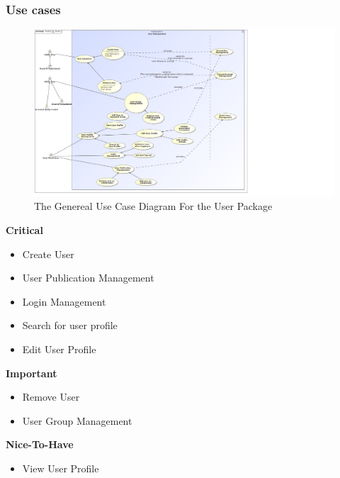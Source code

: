 \documentclass{article}
\begin{document}
	\subsubsection{Use cases}
		\begin{figure}[H]
				\includegraphics[width=1.5\linewidth]{ReinhardtImages/UserManagement.jpg}
				\caption{The Genereal Use Case Diagram For the User Package}
		  		\label{UseCaseDiagram_UserManagement}
			\end{figure}
			\begin{flushleft}
				\textbf{Critical}
					\begin{itemize}
		  				\item Create User
		 	 			\item User Publication Management
		  				\item Login Management
		  				\item Search for user profile
		  				\item Edit User Profile
					\end{itemize}

				\textbf{Important}
					\begin{itemize}
		  				\item Remove User
		  				\item User Group Management
					\end{itemize}

				\textbf{Nice-To-Have}
					\begin{itemize}
		  				\item View User Profile  				
					\end{itemize}
			\end{flushleft}
\end{document}
